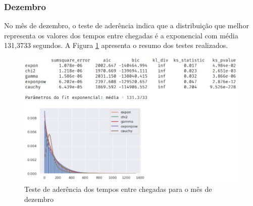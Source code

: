 \subsubsection*{Dezembro}
No mês de dezembro, o teste de aderência indica que a distribuição que melhor representa os valores dos tempos entre chegadas é a exponencial com média 131,3733 segundos. A Figura \ref*{fig: fit-dezembro} apresenta o resumo dos testes realizados.

\begin{figure}[H]
    \includegraphics[scale=0.8]{analise-de-dados/fit/fit-dezembro.png}

    \caption{Teste de aderência dos tempos entre chegadas para o mês de dezembro}
    \label{fig: fit-dezembro}
\end{figure}
